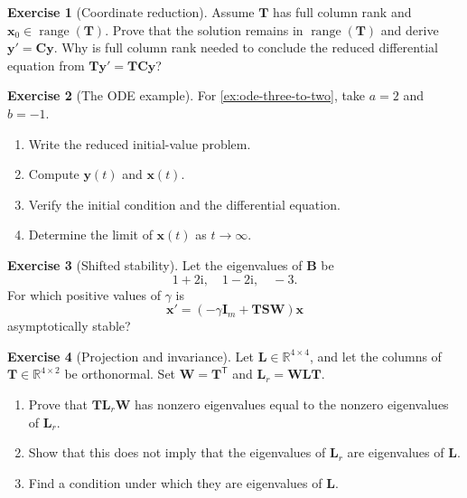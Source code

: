 \documentclass[11pt]{article}
\newcommand{\R}{\mathbb{R}}
\newcommand{\I}{\mathbf{I}}
\newcommand{\mat}[1]{\mathbf{#1}}
\newcommand{\vect}[1]{\mathbf{#1}}
\newcommand{\range}{\operatorname{range}}
\theoremstyle{definition}
\newtheorem{exercise}{Exercise}[section]
\theoremstyle{remark}
\begin{document}
\begin{exercise}[Coordinate reduction]
\label{ex:coordinate-reduction}
Assume \(\mat{T}\) has full column rank and \(\vect{x}_0\in\range(\mat{T})\). Prove that the solution remains in \(\range(\mat{T})\) and derive \(\vect{y}'=\mat{C}\vect{y}\). Why is full column rank needed to conclude the reduced differential equation from
\(\mat{T}\vect{y}'=\mat{T}\mat{C}\vect{y}\)?
\end{exercise}

\begin{exercise}[The ODE example]
\label{ex:verify-ode-example}
For \cref{ex:ode-three-to-two}, take \(a=2\) and \(b=-1\).
\begin{enumerate}[label=(\alph*)]
  \item Write the reduced initial-value problem.
  \item Compute \(\vect{y}(t)\) and \(\vect{x}(t)\).
  \item Verify the initial condition and the differential equation.
  \item Determine the limit of \(\vect{x}(t)\) as \(t\to\infty\).
\end{enumerate}
\end{exercise}

\begin{exercise}[Shifted stability]
\label{ex:shifted-stability-exercise}
Let the eigenvalues of \(\mat{B}\) be
\[
  1+2\mathrm{i},\quad 1-2\mathrm{i},\quad -3.
\]
For which positive values of \(\gamma\) is
\[
  \vect{x}'=(-\gamma\I_m+\mat{T}\mat{S}\mat{W})\vect{x}
\]
asymptotically stable?
\end{exercise}

\begin{exercise}[Projection and invariance]
\label{ex:projection-invariance}
Let \(\mat{L}\in\R^{4\times4}\), and let the columns of
\(\mat{T}\in\R^{4\times2}\) be orthonormal. Set
\(\mat{W}=\mat{T}^{\mathsf T}\) and
\(\mat{L}_r=\mat{W}\mat{L}\mat{T}\).
\begin{enumerate}[label=(\alph*)]
  \item Prove that \(\mat{T}\mat{L}_r\mat{W}\) has nonzero eigenvalues equal to the nonzero eigenvalues of \(\mat{L}_r\).
  \item Show that this does not imply that the eigenvalues of \(\mat{L}_r\) are eigenvalues of \(\mat{L}\).
  \item Find a condition under which they are eigenvalues of \(\mat{L}\).
\end{enumerate}
\end{exercise}
\end{document}
